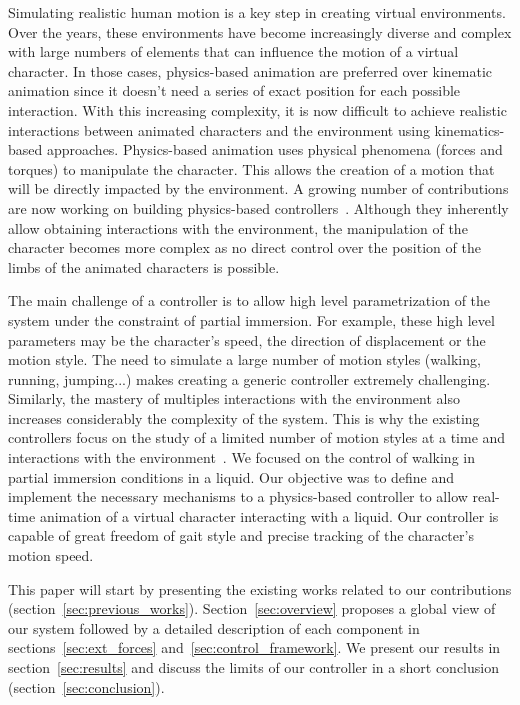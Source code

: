 \documentclass[conference]{acmsiggraph}
\begin{document}
Simulating realistic human motion is a key step in creating virtual environments. Over the years, these environments have become increasingly diverse and complex with large numbers of elements that can influence the motion of a virtual character. In those cases, physics-based animation are preferred over kinematic animation since it doesn't need a series of exact position for each possible interaction. With this increasing complexity, it is now difficult to achieve realistic interactions between animated characters and the environment using kinematics-based approaches. Physics-based animation uses physical phenomena (forces and torques) to manipulate the character. This allows the creation of a motion that will be directly impacted by the environment. A growing number of contributions are now working on building physics-based controllers~\cite{geijtenbeek2012interactive}. Although they inherently allow obtaining interactions with the environment, the manipulation of the character becomes more complex as no direct control over the position of the limbs of the animated characters is possible.

The main challenge of a controller is to allow high level parametrization of the system under the constraint of partial immersion. For example, these high level parameters may be the character's speed, the direction of displacement or the motion style. The need to simulate a large number of motion styles (walking, running, jumping...) makes creating a generic controller extremely challenging. Similarly, the mastery of multiples interactions with the environment also increases considerably the complexity of the system. This is why the existing controllers focus on the study of a limited number of motion styles at a time and interactions with the environment~\cite{geijtenbeek2012interactive}. We focused on the control of walking in partial immersion conditions in a liquid. Our objective was to define and implement the necessary mechanisms to a physics-based controller to allow real-time animation of a virtual character interacting with a liquid. Our controller is capable of great freedom of gait style and precise tracking of the character's motion speed.

This paper will start by presenting the existing works related to our contributions (section~\ref{sec:previous_works}). Section~\ref{sec:overview} proposes a global view of our system followed by a detailed description of each component in sections~\ref{sec:ext_forces} and~\ref{sec:control_framework}. We present our results in section~\ref{sec:results} and discuss the limits of our controller in a short conclusion (section~\ref{sec:conclusion}).
 
\end{document}
